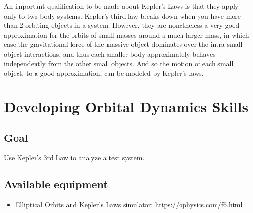 An important qualification to be made about Kepler’s Laws is that they apply only to two-body
systems. Kepler’s third law breaks down when you have more than 2 orbiting objects in a system.
However, they are nonetheless a very good approximation for the orbits of small masses around a much
larger mass, in which case the gravitational force of the massive object dominates over the intra-small-
object interactions, and thus each smaller body approximately behaves independently from the other
small objects. And so the motion of each small object, to a good approximation, can be modeled by
Kepler’s laws.

\section{Developing Orbital Dynamics Skills}

%


\subsection{Goal}
Use Kepler's 3rd Law to analyze a test system.
\subsection{Available equipment}
\begin{itemize}
	\item Elliptical Orbits and Kepler's Laws simulator: \url{https://ophysics.com/f6.html}
\end{itemize}

